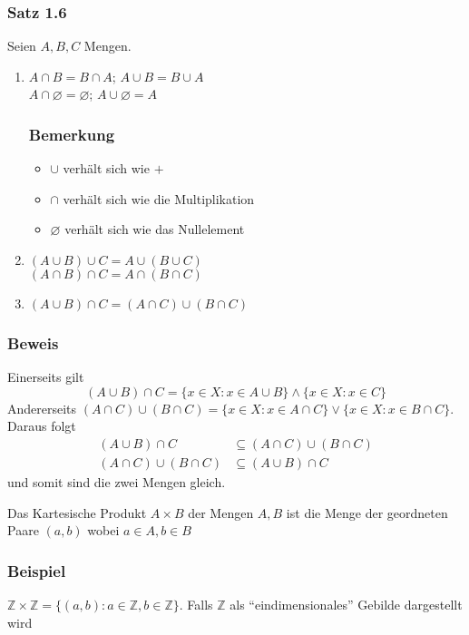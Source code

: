 \subsubsection*{Satz 1.6}
Seien $A,B,C$ Mengen. 
\begin{enumerate}
\item $A\cap B=B\cap A$; $A\cup B=B\cup A$\\
$A\cap \varnothing=\varnothing$; $A\cup \varnothing=A$\vspace{-4mm}
\subsubsection*{Bemerkung}
\begin{itemize}
    \item $\cup$ verhält sich wie $+$
    \item $\cap$ verhält sich wie die Multiplikation
    \item $\varnothing$ verhält sich wie das Nullelement
\end{itemize}
    \item $\left( A\cup B\right)\cup C=A\cup\left( B\cup C\right)$\\
    $\left( A\cap B\right)\cap C=A\cap\left( B\cap C\right)$
    \item $\left( A\cup B\right) \cap C=\left( A\cap C\right) \cup \left( B\cap C\right)$
\end{enumerate}



\subsubsection*{Beweis}
Einerseits gilt
\[
(A \cup B) \cap C = \{x \in X: x \in A \cup B \} \land \{ x \in X: x \in C\}
\]
Andererseits $(A \cap C) \cup ( B \cap C) = \{ x \in X: x \in A \cap C \} \lor \{ x \in X : x \in B \cap C \}$. Daraus folgt
\begin{align*}
(A \cup B ) \cap C &\subseteq (A \cap C) \cup (B \cap C) \\
(A \cap C ) \cup (B \cap C) &\subseteq (A \cup B) \cap C
\end{align*}
und somit sind die zwei Mengen gleich.

\begin{definition}{1.7}
Das Kartesische Produkt $A\times B$ der Mengen $A,B$ ist die Menge der geordneten Paare $(a,b)$ wobei $a\in A, b\in B$
\end{definition}

\subsubsection*{Beispiel}
$\mathbb{Z}\times\mathbb{Z}=\{(a,b):a\in\mathbb{Z},b\in\mathbb{Z}\}$. Falls $\mathbb{Z}$ als ``eindimensionales'' Gebilde dargestellt wird 


